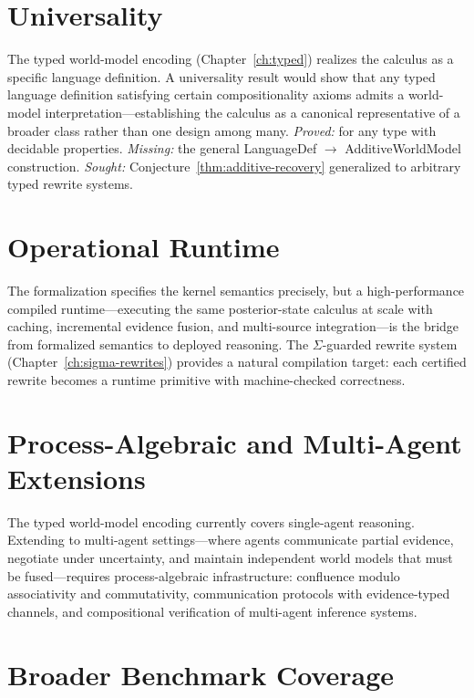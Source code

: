 \documentclass[11pt,openany]{report}
\begin{document}
\section{Universality}

The typed world-model encoding
(Chapter~\ref{ch:typed}) realizes the calculus as a specific
language definition.  A universality result would show that any typed
language definition satisfying certain compositionality axioms admits
a world-model interpretation---establishing the calculus as a
canonical representative of a broader class rather than one design
among many.
\emph{Proved:}  for any type
with decidable properties.
\emph{Missing:} the general LanguageDef $\to$
AdditiveWorldModel construction.
\emph{Sought:} Conjecture~\ref{thm:additive-recovery} generalized
to arbitrary typed rewrite systems.

\section{Operational Runtime}

The formalization specifies the kernel semantics precisely, but a
high-performance compiled runtime---executing the same
posterior-state calculus at scale with caching, incremental evidence
fusion, and multi-source integration---is the bridge from formalized
semantics to deployed reasoning.  The $\Sigma$-guarded rewrite
system (Chapter~\ref{ch:sigma-rewrites}) provides a natural
compilation target: each certified rewrite becomes a runtime
primitive with machine-checked correctness.

\section{Process-Algebraic and Multi-Agent Extensions}

The typed world-model encoding currently covers single-agent
reasoning.  Extending to multi-agent settings---where agents
communicate partial evidence, negotiate under uncertainty, and
maintain independent world models that must be fused---requires
process-algebraic infrastructure: confluence modulo associativity and
commutativity, communication protocols with evidence-typed channels,
and compositional verification of multi-agent inference systems.

\section{Broader Benchmark Coverage}
\end{document}
